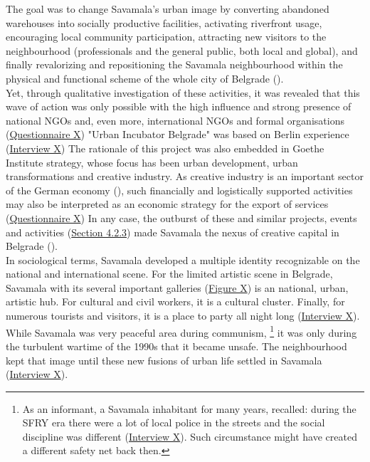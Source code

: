 \documentclass[11pt]{report}
\begin{document}
The goal was to change Savamala's urban image by converting  abandoned warehouses into socially productive facilities, activating riverfront usage, encouraging local community participation, attracting new visitors to the neighbourhood (professionals and the general public, both local and global), and finally revalorizing and repositioning the Savamala neighbourhood within the physical and functional scheme of the whole city of Belgrade (\href{Cvetinovic}{\citealt{cvetinovic_engine_2013}}).
\\

Yet, through qualitative investigation of these activities, it was revealed that this wave of action was only possible with the high influence and strong presence of national NGOs and, even more, international NGOs and formal organisations 
(\href{Questionnaire Experts Savamala}{Questionnaire X}) 
"Urban Incubator Belgrade" was based on Berlin experience
(\href{InterviewX}{Interview X})
The rationale of this project was also embedded in Goethe Institute strategy, whose focus has been urban development, urban transformations and creative industry. As creative industry is an important sector of the German economy
(\href{Lanz}{\citealt{lanz_cities_2012}}),
such financially and logistically supported activities may also be interpreted as an economic strategy for the export of services (\href{Questionnaire Experts Savamala}{Questionnaire X})
In any case, the outburst of these and similar projects, events and activities (\href{Section 4.2.3}{Section 4.2.3}) made Savamala the nexus of creative capital in Belgrade (\href{B92}{\citealt{b92_savamala_2015}}). %
\\

In sociological terms, Savamala developed a multiple identity recognizable on the national and international scene. For the limited artistic scene in Belgrade, Savamala with its  several important galleries (\href{Figure X}{Figure X})
is an national, urban, artistic hub.
For cultural and civil workers, it is a cultural cluster.
Finally, for numerous tourists and visitors, it is a place to party all night long (\href{InterviewX}{Interview X}).
\\

While Savamala was very peaceful area during communism,
\footnote{As an informant, a Savamala inhabitant for many years, recalled: during the SFRY era there were a lot of local police in the streets and the social discipline was different
(\href{InterviewX}{Interview X}).
Such circumstance might have created a different safety net back then.}
it was only during the turbulent wartime of the 1990s that it became unsafe.
The neighbourhood kept that image until these new fusions of urban life settled in Savamala (\href{InterviewX}{Interview X}).
\\
\end{document}
